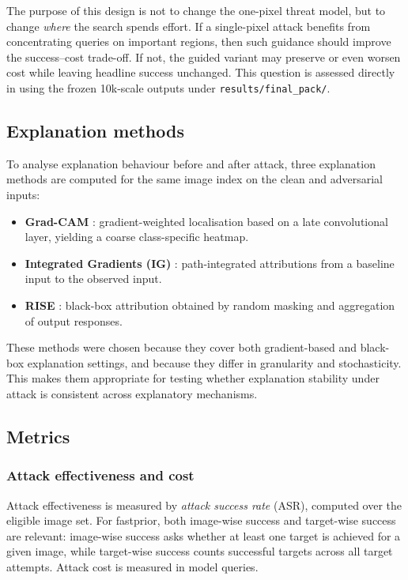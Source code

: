 The purpose of this design is not to change the one-pixel threat model, but to change \emph{where} the search spends effort.
If a single-pixel attack benefits from concentrating queries on important regions, then such guidance should improve the success--cost trade-off.
If not, the guided variant may preserve or even worsen cost while leaving headline success unchanged.
This question is assessed directly in  using the frozen 10k-scale outputs under \texttt{results/final\_pack/}.

\subsection{Explanation methods}
To analyse explanation behaviour before and after attack, three explanation methods are computed for the same image index on the clean and adversarial inputs:
\begin{itemize}
  \item \textbf{Grad-CAM} \cite{selvaraju2017gradcam}: gradient-weighted localisation based on a late convolutional layer, yielding a coarse class-specific heatmap.
  \item \textbf{Integrated Gradients (IG)} \cite{sundararajan2017ig}: path-integrated attributions from a baseline input to the observed input.
  \item \textbf{RISE} \cite{petsiuk2018rise}: black-box attribution obtained by random masking and aggregation of output responses.
\end{itemize}

These methods were chosen because they cover both gradient-based and black-box explanation settings, and because they differ in granularity and stochasticity.
This makes them appropriate for testing whether explanation stability under attack is consistent across explanatory mechanisms.

\subsection{Metrics}
\subsubsection{Attack effectiveness and cost}
Attack effectiveness is measured by \emph{attack success rate} (ASR), computed over the eligible image set.
For fastprior, both image-wise success and target-wise success are relevant: image-wise success asks whether at least one target is achieved for a given image, while target-wise success counts successful targets across all target attempts.
Attack cost is measured in model queries.

